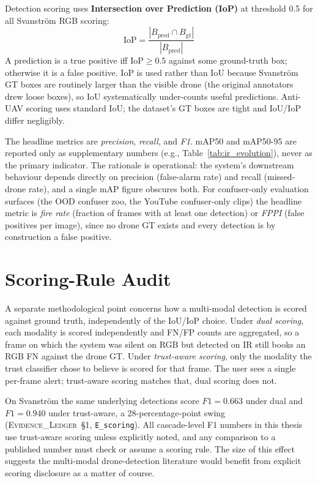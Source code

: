 \documentclass[12pt,a4paper,oneside,openright]{book}
\begin{document}
Detection scoring uses \textbf{Intersection over Prediction (IoP)} at threshold 0.5 for all Svanstr\"om RGB scoring:
\[
\text{IoP} = \frac{|B_\text{pred} \cap B_\text{gt}|}{|B_\text{pred}|}
\]
A prediction is a true positive iff $\text{IoP} \geq 0.5$ against some ground-truth box; otherwise it is a false positive. IoP is used rather than IoU because Svanstr\"om GT boxes are routinely larger than the visible drone (the original annotators drew loose boxes), so IoU systematically under-counts useful predictions. Anti-UAV scoring uses standard IoU; the dataset's GT boxes are tight and IoU/IoP differ negligibly.

The headline metrics are \emph{precision}, \emph{recall}, and \emph{F1}. mAP50 and mAP50-95 are reported only as supplementary numbers (e.g., Table~\ref{tab:ir_evolution}), never as the primary indicator. The rationale is operational: the system's downstream behaviour depends directly on precision (false-alarm rate) and recall (missed-drone rate), and a single mAP figure obscures both. For confuser-only evaluation surfaces (the OOD confuser zoo, the YouTube confuser-only clips) the headline metric is \emph{fire rate} (fraction of frames with at least one detection) or \emph{FPPI} (false positives per image), since no drone GT exists and every detection is by construction a false positive.

\section{Scoring-Rule Audit}
\label{sec:scoring_audit}

A separate methodological point concerns how a multi-modal detection is scored against ground truth, independently of the IoU/IoP choice. Under \emph{dual scoring}, each modality is scored independently and FN/FP counts are aggregated, so a frame on which the system was silent on RGB but detected on IR still books an RGB FN against the drone GT. Under \emph{trust-aware scoring}, only the modality the trust classifier chose to believe is scored for that frame. The user sees a single per-frame alert; trust-aware scoring matches that, dual scoring does not.

On Svanstr\"om the same underlying detections score $F1=0.663$ under dual and $F1=0.940$ under trust-aware, a 28-percentage-point swing (\textsc{Evidence\_Ledger}~\S1, \texttt{E\_scoring}). All cascade-level F1 numbers in this thesis use trust-aware scoring unless explicitly noted, and any comparison to a published number must check or assume a scoring rule. The size of this effect suggests the multi-modal drone-detection literature would benefit from explicit scoring disclosure as a matter of course.
\end{document}

